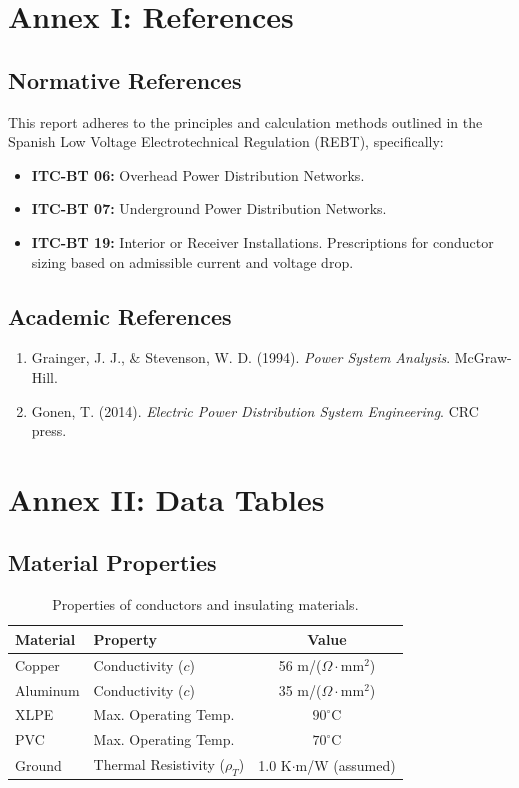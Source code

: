 \documentclass[12pt, a4paper]{article}
\begin{document}
\newpage
\appendix
\section{Annex I: References}
\subsection{Normative References}
This report adheres to the principles and calculation methods outlined in the Spanish Low Voltage Electrotechnical Regulation (REBT), specifically:
\begin{itemize}
    \item \textbf{ITC-BT 06:} Overhead Power Distribution Networks.
    \item \textbf{ITC-BT 07:} Underground Power Distribution Networks.
    \item \textbf{ITC-BT 19:} Interior or Receiver Installations. Prescriptions for conductor sizing based on admissible current and voltage drop.
\end{itemize}

\subsection{Academic References}
\begin{enumerate}
    \item Grainger, J. J., \& Stevenson, W. D. (1994). \textit{Power System Analysis}. McGraw-Hill.
    \item Gonen, T. (2014). \textit{Electric Power Distribution System Engineering}. CRC press.
\end{enumerate}

\section{Annex II: Data Tables}
\subsection{Material Properties}
\begin{table}[htbp]
    \centering
    \caption{Properties of conductors and insulating materials.}
    \label{tab:material_properties}
    \begin{tabular}{@{}llc@{}}
        \toprule
        \textbf{Material} & \textbf{Property} & \textbf{Value} \\ \midrule
        Copper & Conductivity ($c$) & 56 m/($\Omega \cdot \text{mm}^2$) \\
        Aluminum & Conductivity ($c$) & 35 m/($\Omega \cdot \text{mm}^2$) \\
        \midrule
        XLPE & Max. Operating Temp. & $90^\circ$C \\
        PVC & Max. Operating Temp. & $70^\circ$C \\
        \midrule
        Ground & Thermal Resistivity ($\rho_T$) & 1.0 K$\cdot$m/W (assumed) \\
        \bottomrule
    \end{tabular}
\end{table}
\end{document}
